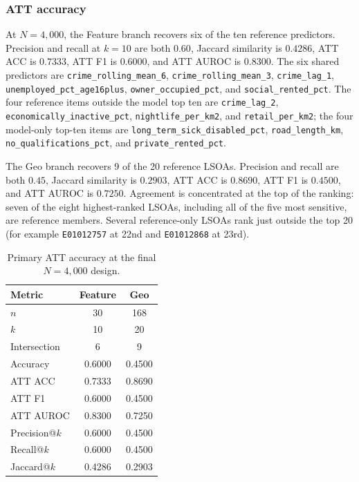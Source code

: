\subsubsection{ATT accuracy}
\label{sec:hull_att_accuracy}

At $N=4{,}000$, the Feature branch recovers six of the ten reference predictors. Precision and recall at $k=10$ are both $0.60$, Jaccard similarity is $0.4286$, ATT ACC is $0.7333$, ATT F1 is $0.6000$, and ATT AUROC is $0.8300$. The six shared predictors are \nolinkurl{crime_rolling_mean_6}, \nolinkurl{crime_rolling_mean_3}, \nolinkurl{crime_lag_1}, \nolinkurl{unemployed_pct_age16plus}, \nolinkurl{owner_occupied_pct}, and \nolinkurl{social_rented_pct}. The four reference items outside the model top ten are \nolinkurl{crime_lag_2}, \nolinkurl{economically_inactive_pct}, \nolinkurl{nightlife_per_km2}, and \nolinkurl{retail_per_km2}; the four model-only top-ten items are \nolinkurl{long_term_sick_disabled_pct}, \nolinkurl{road_length_km}, \nolinkurl{no_qualifications_pct}, and \nolinkurl{private_rented_pct}.

The Geo branch recovers 9 of the 20 reference LSOAs. Precision and recall are both $0.45$, Jaccard similarity is $0.2903$, ATT ACC is $0.8690$, ATT F1 is $0.4500$, and ATT AUROC is $0.7250$. Agreement is concentrated at the top of the ranking: seven of the eight highest-ranked LSOAs, including all of the five most sensitive, are reference members. Several reference-only LSOAs rank just outside the top 20 (for example \texttt{E01012757} at 22nd and \texttt{E01012868} at 23rd).

\begin{table}[H]
\centering
\caption{Primary ATT accuracy at the final $N=4{,}000$ design.}
\label{tab:hull_att_accuracy_primary}
\small
\begin{tabular}{lcc}
\toprule
Metric & Feature & Geo \\
\midrule
$n$             & 30     & 168 \\
$k$             & 10     & 20 \\
Intersection    & 6      & 9 \\
Accuracy        & 0.6000 & 0.4500 \\
ATT ACC         & 0.7333 & 0.8690 \\
ATT F1          & 0.6000 & 0.4500 \\
ATT AUROC       & 0.8300 & 0.7250 \\
Precision@$k$   & 0.6000 & 0.4500 \\
Recall@$k$      & 0.6000 & 0.4500 \\
Jaccard@$k$     & 0.4286 & 0.2903 \\
\bottomrule
\end{tabular}
\end{table}

